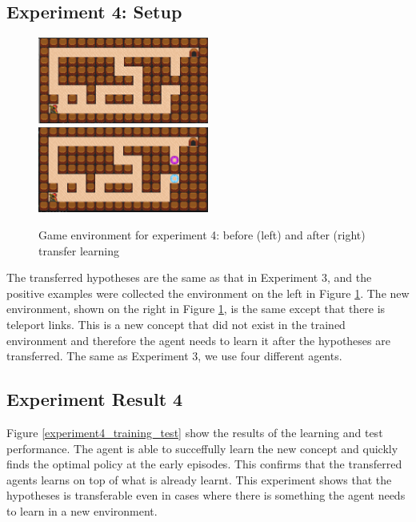 \subsection{Experiment 4: Setup}
\label{subsec:experiement4_setup}
\begin{figure}[!htb]
\centerline{
\includegraphics[width=0.5\textwidth]{./figures/experiment4_before}
\includegraphics[width=0.5\textwidth]{./figures/experiment4_after}}
\caption{Game environment for experiment 4: before (left) and after (right) transfer learning}
\label{experiment4_setup}
\end{figure}

The transferred hypotheses are the same as that in Experiment 3, and the positive examples were collected the environment on the left in Figure \ref{experiment4_setup}.
The new environment, shown on the right in Figure \ref{experiment4_setup}, is the same except that there is teleport links.
This is a new concept that did not exist in the trained environment and therefore the agent needs to learn it after the hypotheses are transferred.
The same as Experiment 3, we use four different agents.

\subsection{Experiment Result 4}
\label{subsec:experiment_result_4}

Figure \ref{experiment4_training_test} show the results of the learning and test performance. 
The agent is able to succeffully learn the new concept and quickly finds the optimal policy at the early episodes.
This confirms that the transferred agents learns on top of what is already learnt. This experiment shows that the hypotheses is transferable even in cases where there is something the agent needs to learn in a new environment.

